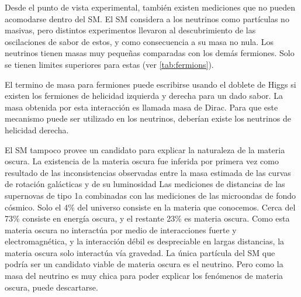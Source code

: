 Desde el punto de vista experimental, también existen mediciones que no pueden
acomodarse dentro del SM. El SM considera a los neutrinos como partículas no
masivas, pero distintos
experimentos\cite{PhysRevLett.101.111301,PhysRevD.78.032002} llevaron al
descubrimiento de las oscilaciones de sabor de estos, y como consecuencia a su
masa no nula. Los neutrinos tienen masas muy peque\~nas comparadas con los demás
fermiones. Solo se tienen limites superiores para estas (ver
\cref{tab:fermions}).

El termino de masa para fermiones puede escribirse usando el doblete de Higgs si
existen los fermiones de helicidad izquierda y derecha para un dado sabor. La
masa obtenida por esta interacción es llamada masa de Dirac. Para que este
mecanismo puede ser utilizado en los neutrinos, deberían existe los neutrinos
de helicidad derecha.

El SM tampoco provee un candidato para explicar la naturaleza de la materia
oscura. La existencia de la materia oscura fue inferida por primera vez como
resultado de las inconsistencias observadas entre la masa estimada de las curvas
de rotación galácticas y de su luminosidad\cite{DM1} Las mediciones de
distancias de las supernovas de tipo 1a combinadas con las mediciones de las
microondas de fondo cósmico. Solo el 4\% del universo consiste en la materia que
conocemos\cite{DM2}. Cerca del 73\% consiste en energía oscura, y el restante
23\% es materia oscura. Como esta materia oscura no interactúa por medio de
interacciones fuerte y electromagnética, y la interacción débil es despreciable
en largas distancias, la materia oscura solo interactúa vía gravedad. La única
partícula del SM que podría ser un candidato viable de materia oscura es el
neutrino. Pero como la masa del neutrino es muy chica para poder explicar los
fenómenos de materia oscura, puede descartarse.



